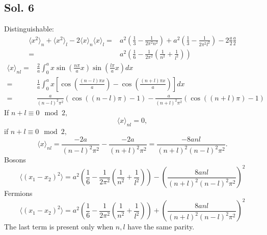 \subsection*{Sol. 6}
Distinguishable:
   \begin{align*}
        \langle x^2\rangle_n
    +\langle x^2\rangle_l
    -2
    \langle x\rangle_n
    \langle x\rangle_l
    =&
    a^2\left(\frac{1}{3}-\frac{1}{2\pi^2n^2}    \right)
    +
    a^2\left(\frac{1}{3}-\frac{1}{2\pi^2l^2}    \right)
    -2\frac{a}{2}\frac{a}{2}\\
    =&
    a^2\left(\frac{1}{6}-\frac{1}{2\pi^2}
    \left(\frac{1}{n^2}+\frac{1}{l^2}\right)\right)
   \end{align*}
   \begin{align*}
       \langle x\rangle_{nl}
       =&\frac{2}{a}\int_0^ax\sin(\frac{n\pi}{a}x)\sin(\frac{l\pi}{a}x)dx\\
       =&\frac{1}{a}
       \int_0^a
       x\left[
       \cos(\frac{(n-l)\pi x}{a})
       -
       \cos(\frac{(n+l)\pi x}{a})
       \right]
       dx\\
       =&
       \frac{a}{(n-l)^2\pi^2}
       (\cos((n-l)\pi )-1)
       -\frac{a}{(n+l)^2\pi^2}
       (\cos((n+l)\pi )-1)
   \end{align*}
   If $n+l\equiv0\mod 2,$
   $$
   \langle x\rangle_{nl}=0,
   $$
    if $n+l\equiv0\mod 2,$
   $$
   \langle x\rangle_{nl}=
   \frac{-2a}{(n-l)^2\pi^2}-\frac{-2a}{(n+l)^2\pi^2}
   =\frac{-8anl}{(n+l)^2(n-l)^2\pi^2}.
   $$
   Bosons
   $$
   \langle(x_1-x_2)^2\rangle
   =a^2\left(\frac{1}{6}-\frac{1}{2\pi^2}
    \left(\frac{1}{n^2}+\frac{1}{l^2}\right)\right)
    -
    \left(\frac{8anl}{(n+l)^2(n-l)^2\pi^2}\right)^2
   $$
   Fermions
   $$
   \langle(x_1-x_2)^2\rangle
   =a^2\left(\frac{1}{6}-\frac{1}{2\pi^2}
    \left(\frac{1}{n^2}+\frac{1}{l^2}\right)\right)
    +
    \left(\frac{8anl}{(n+l)^2(n-l)^2\pi^2}\right)^2
   $$
   The last term is present only when $n,l$ have the same parity.
   
   
